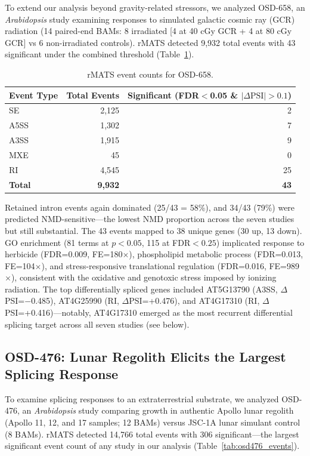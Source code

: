 \documentclass[12pt,a4paper]{article}
\begin{document}
To extend our analysis beyond gravity-related stressors, we analyzed OSD-658, an \textit{Arabidopsis} study examining responses to simulated galactic cosmic ray (GCR) radiation (14 paired-end BAMs: 8 irradiated [4 at 40 cGy GCR + 4 at 80 cGy GCR] vs 6 non-irradiated controls). rMATS detected 9,932 total events with 43 significant under the combined threshold (Table~\ref{tab:osd658_events}).

\begin{table}[h]
\centering
\caption{rMATS event counts for OSD-658.}
\label{tab:osd658_events}
\begin{tabular}{lrr}
\toprule
\textbf{Event Type} & \textbf{Total Events} & \textbf{Significant (FDR$<$0.05 \& $|\Delta\text{PSI}|>0.1$)} \\
\midrule
SE & 2,125 & 2 \\
A5SS & 1,302 & 7 \\
A3SS & 1,915 & 9 \\
MXE & 45 & 0 \\
RI & 4,545 & 25 \\
\textbf{Total} & \textbf{9,932} & \textbf{43} \\
\bottomrule
\end{tabular}
\end{table}

Retained intron events again dominated (25/43 = 58\%), and 34/43 (79\%) were predicted NMD-sensitive---the lowest NMD proportion across the seven studies but still substantial. The 43 events mapped to 38 unique genes (30 up, 13 down). GO enrichment (81 terms at $p<0.05$, 115 at FDR$<0.25$) implicated response to herbicide (FDR=0.009, FE=180$\times$), phospholipid metabolic process (FDR=0.013, FE=104$\times$), and stress-responsive translational regulation (FDR=0.016, FE=989$\times$), consistent with the oxidative and genotoxic stress imposed by ionizing radiation. The top differentially spliced genes included AT5G13790 (A3SS, $\Delta$PSI=$-$0.485), AT4G25990 (RI, $\Delta$PSI=+0.476), and AT4G17310 (RI, $\Delta$PSI=+0.416)---notably, AT4G17310 emerged as the most recurrent differential splicing target across all seven studies (see below).

\subsection{OSD-476: Lunar Regolith Elicits the Largest Splicing Response}

To examine splicing responses to an extraterrestrial substrate, we analyzed OSD-476, an \textit{Arabidopsis} study comparing growth in authentic Apollo lunar regolith (Apollo 11, 12, and 17 samples; 12 BAMs) versus JSC-1A lunar simulant control (8 BAMs). rMATS detected 14,766 total events with 306 significant---the largest significant event count of any study in our analysis (Table~\ref{tab:osd476_events}).
\end{document}
